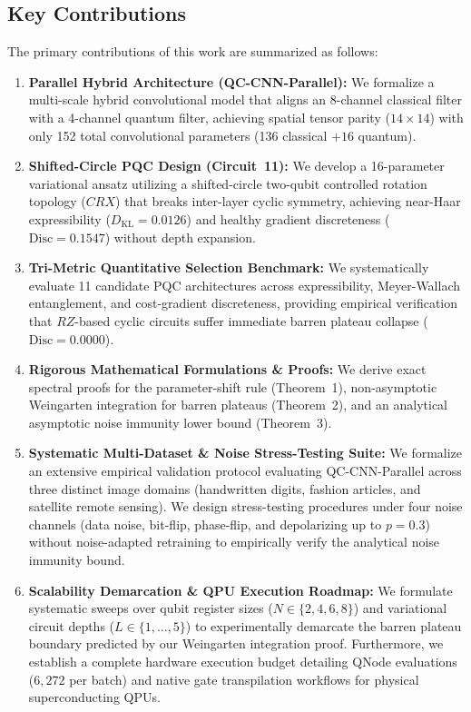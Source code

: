 \documentclass[pdflatex,sn-mathphys-num]{sn-jnl}%
\theoremstyle{thmstyleone}%
\theoremstyle{thmstyletwo}%
\theoremstyle{thmstylethree}%
\begin{document}
\subsection{Key Contributions}
The primary contributions of this work are summarized as follows:
\begin{enumerate}
    \item \textbf{Parallel Hybrid Architecture (QC-CNN-Parallel):} We formalize a multi-scale hybrid convolutional model that aligns an 8-channel classical filter with a 4-channel quantum filter, achieving spatial tensor parity ($14 \times 14$) with only 152 total convolutional parameters (136 classical $+ 16$ quantum).
    \item \textbf{Shifted-Circle PQC Design (Circuit~11):} We develop a 16-parameter variational ansatz utilizing a shifted-circle two-qubit controlled rotation topology ($CRX$) that breaks inter-layer cyclic symmetry, achieving near-Haar expressibility ($D_{\mathrm{KL}} = 0.0126$) and healthy gradient discreteness ($\mathrm{Disc} = 0.1547$) without depth expansion.
    \item \textbf{Tri-Metric Quantitative Selection Benchmark:} We systematically evaluate 11 candidate PQC architectures across expressibility, Meyer-Wallach entanglement, and cost-gradient discreteness, providing empirical verification that $RZ$-based cyclic circuits suffer immediate barren plateau collapse ($\mathrm{Disc} = 0.0000$).
    \item \textbf{Rigorous Mathematical Formulations \& Proofs:} We derive exact spectral proofs for the parameter-shift rule (Theorem~1), non-asymptotic Weingarten integration for barren plateaus (Theorem~2), and an analytical asymptotic noise immunity lower bound (Theorem~3).
    \item \textbf{Systematic Multi-Dataset \& Noise Stress-Testing Suite:} We formalize an extensive empirical validation protocol evaluating QC-CNN-Parallel across three distinct image domains (handwritten digits, fashion articles, and satellite remote sensing). We design stress-testing procedures under four noise channels (data noise, bit-flip, phase-flip, and depolarizing up to $p = 0.3$) without noise-adapted retraining to empirically verify the analytical noise immunity bound.
    \item \textbf{Scalability Demarcation \& QPU Execution Roadmap:} We formulate systematic sweeps over qubit register sizes ($N \in \{2,4,6,8\}$) and variational circuit depths ($L \in \{1,\dots,5\}$) to experimentally demarcate the barren plateau boundary predicted by our Weingarten integration proof. Furthermore, we establish a complete hardware execution budget detailing QNode evaluations ($6,272$ per batch) and native gate transpilation workflows for physical superconducting QPUs.
\end{enumerate}
\end{document}
